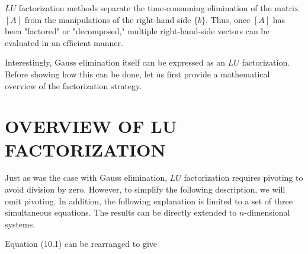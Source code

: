\documentclass[../main.tex]{subfiles}
\begin{document}
$LU$ factorization methods separate the time-consuming elimination of the matrix $[A]$ from the manipulations of the right-hand side $\{b\}$. Thus, once $[A]$ has been "factored" or "decomposed," multiple right-hand-side vectors can be evaluated in an efficient manner.

Interestingly, Gauss elimination itself can be expressed as an $LU$ factorization. Before showing how this can be done, let us first provide a mathematical overview of the factorization strategy.

\section{OVERVIEW OF LU FACTORIZATION}

Just as was the case with Gauss elimination, $LU$ factorization requires pivoting to avoid division by zero. However, to simplify the following description, we will omit pivoting. In addition, the following explanation is limited to a set of three simultaneous equations. The results can be directly extended to $n$-dimensional systems.

Equation (10.1) can be rearranged to give
\end{document}
